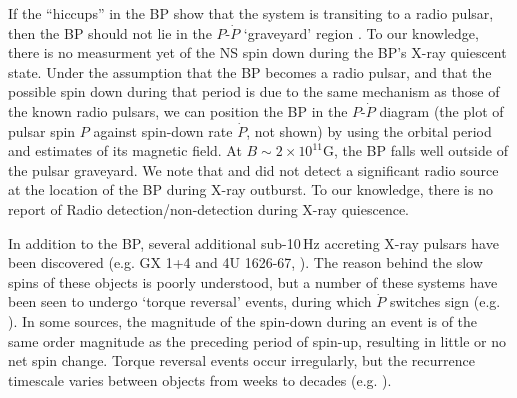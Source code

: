 \par If the ``hiccups'' in the BP show that the system is transiting to a radio pulsar, then the BP should not lie in the $P$-$\dot{P}$ `graveyard' region \citep[e.g.][]{vandenHeuvel_Graveyard}. To our knowledge, there is no measurment yet of the NS spin down during the BP's X-ray quiescent state. Under the assumption that the BP becomes a radio pulsar, and that the possible spin down during that period is due to the same mechanism as those of the known radio pulsars, we can position the BP in the $P$-$\dot{P}$ diagram (the plot of pulsar spin $P$ against spin-down rate $\dot{P}$, not shown) by using the orbital period and estimates of its magnetic field. At $B\sim2\times10^{11}$G, the BP falls well outside of the pulsar graveyard. We note that \citet{Pandey-Pommier_BPRad} and \citet{Russell_BPRad} did not detect a significant radio source at the location of the BP during X-ray outburst. To our knowledge, there is no report of Radio detection/non-detection during X-ray quiescence.


%
%

\par In addition to the BP, several additional sub-10\,Hz accreting X-ray pulsars have been discovered (e.g. GX 1+4 and 4U 1626-67, \citealp{Lewin_GX1,Rappaport_4U}). The reason behind the slow spins of these objects is poorly understood, but a number of these systems have been seen to undergo `torque reversal' events, during which $\dot{P}$ switches sign (e.g. \citealp{Chakrabarty_4U,Chakrabarty_GX14}). In some sources, the magnitude of the spin-down during an event is of the same order magnitude as the preceding period of spin-up, resulting in little or no net spin change. Torque reversal events occur irregularly, but the recurrence timescale varies between objects from weeks to decades (e.g. \citealp{Bildsten_Rev}).


